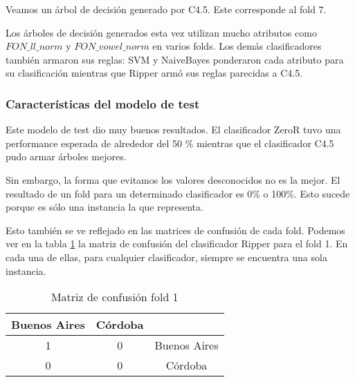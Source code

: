 Veamos un árbol de decisión generado por C4.5. Este corresponde al fold 7. 

Los árboles de decisión generados esta vez utilizan mucho  atributos como $FON\_ll\_norm$ y $FON\_vowel\_norm$ en varios folds. Los demás clasificadores también armaron sus reglas: SVM y NaiveBayes ponderaron cada atributo para su clasificación mientras que Ripper armó sus reglas parecidas a C4.5. 

\subsubsection{Características del modelo de test}

Este modelo de test dio muy buenos resultados. El clasificador ZeroR tuvo una performance esperada de alrededor del 50 \% mientras que el clasificador C4.5 pudo armar árboles mejores. 

Sin embargo, la forma que evitamos los valores desconocidos no es la mejor. El resultado de un fold para un determinado clasificador es 0\% o 100\%. Esto sucede porque es sólo una instancia la que representa. 

Esto también se ve reflejado en las matrices de confusión de cada fold. Podemos ver en la tabla \ref{PAH_mat_conf_f1_solo0o1} la matriz de confusión del clasificador Ripper para el fold 1. En cada una de ellas, para cualquier clasificador, siempre se encuentra una sola instancia. 

\begin{table}[H]
	\centering
	\begin{tabular}{|c|c|c|}
		\hline
		Buenos Aires & Córdoba & \\ \hline
		1 & 0 & Buenos Aires\\ \hline
		0 & 0 & Córdoba\\ \hline
	\end{tabular}
	\caption{Matriz de confusión fold 1}
	\label{PAH_mat_conf_f1_solo0o1}
\end{table}


